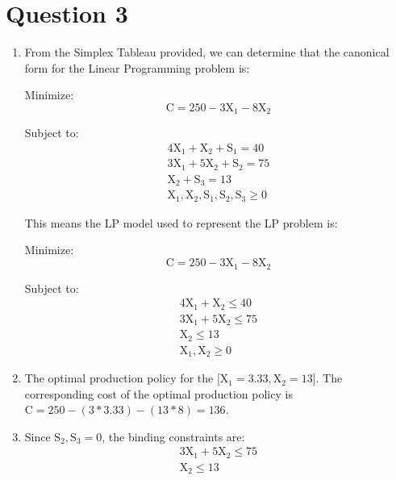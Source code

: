 \section*{Question 3}
\begin{enumerate}

\item
From the Simplex Tableau provided, we can determine that the canonical form for the Linear Programming problem is:

Minimize:
\begin{equation*}
	\text{C} = 250 - 3\text{X}_1 - 8\text{X}_2
\end{equation*}

Subject to:
\begin{gather*}
	4\text{X}_1 + \text{X}_2 + \text{S}_1 = 40 \\
	3\text{X}_1 + 5\text{X}_2 + \text{S}_2 = 75 \\
	\text{X}_2 + \text{S}_3 = 13 \\
	\text{X}_1, \text{X}_2, \text{S}_1, \text{S}_2, \text{S}_3 \geq 0
\end{gather*}

This means the LP model used to represent the LP problem is:

Minimize:
\begin{equation*}
	\text{C} = 250 - 3\text{X}_1 - 8\text{X}_2
\end{equation*}

Subject to:
\begin{gather*}
	4\text{X}_1 + \text{X}_2 \leq 40 \\
	3\text{X}_1 + 5\text{X}_2 \leq 75 \\
	\text{X}_2 \leq 13 \\
	\text{X}_1, \text{X}_2 \geq 0
\end{gather*}

	
\item
The optimal production policy for the [$\text{X}_1 = 3.33, \text{X}_2 = 13$]. The corresponding cost of the optimal production policy is $\text{C} = 250 - (3*3.33) - (13*8) = 136$.

\item
Since $\text{S}_2, \text{S}_3 = 0$, the binding constraints are:
\begin{gather*}
	3\text{X}_1 + 5\text{X}_2 \leq 75 \\
	\text{X}_2 \leq 13
\end{gather*}

\end{enumerate}